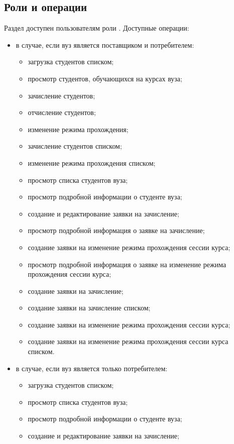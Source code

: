 \subsection{Роли и операции}
Раздел доступен пользователям роли . Доступные операции:
\begin{itemize}
	\item в случае, если вуз является поставщиком и потребителем:
		\begin{itemize}
			\item загрузка студентов списком;
			\item просмотр студентов, обучающихся на курсах вуза;
			\item зачисление студентов;
			\item отчисление студентов;
			\item изменение режима прохождения;
			\item зачисление студентов списком;
			\item изменение режима прохождения списком;
			\item просмотр списка студентов вуза;
			\item просмотр подробной информации о студенте вуза;
			\item создание и редактирование заявки на зачисление;
			\item просмотр подробной информация о заявке на зачисление;
			\item создание заявки на изменение режима прохождения сессии курса;
			\item просмотр подробной информация о заявке на изменение режима прохождения сессии курса;
			\item создание заявки на зачисление;
			\item создание заявки на зачисление списком;
			\item создание заявки на изменение режима прохождения сессии курса;
			\item создание заявки на изменение режима прохождения сессии курса списком.
		\end{itemize}
	\item в случае, если вуз является только потребителем:
		\begin{itemize}
			\item загрузка студентов списком;
			\item просмотр списка студентов вуза;
			\item просмотр подробной информации о студенте вуза;
			\item создание и редактирование заявки на зачисление;

\end{itemize}
\end{itemize}
